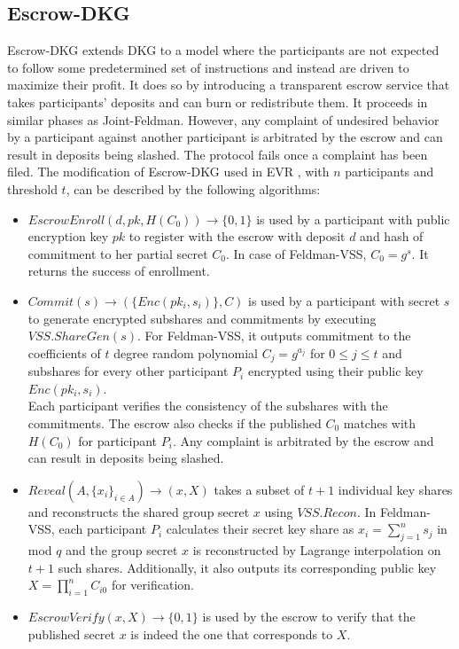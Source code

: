 \documentclass[letterpaper,twocolumn,10pt]{article}
\theoremstyle{definition}
\theoremstyle{remark}
\begin{document}
\subsection{Escrow-DKG}
\label{appendix:edkg}
Escrow-DKG \cite{david2019rational} extends DKG to a model where the participants are not expected to follow some predetermined set of instructions and instead are driven to maximize their profit. It does so by introducing a transparent escrow service that takes participants' deposits and can burn or redistribute them. It proceeds in similar phases as Joint-Feldman. However, any complaint of undesired behavior by a participant against another participant is arbitrated by the escrow and can result in deposits being slashed. The protocol fails once a complaint has been filed. The modification of Escrow-DKG used in EVR , with $n$ participants and threshold $t$, can be described by the following algorithms:
\begin{itemize}
    \item $EscrowEnroll(d, pk, H(C_{0})) \rightarrow \{0,1\}$ is used by a participant with public encryption key $pk$ to register with the escrow with deposit $d$ and hash of commitment to her partial secret $C_{0}$. In case of Feldman-VSS, $C_{0} = g^{s}$. It returns the success of enrollment.
    
    \item $Commit (s) \rightarrow (\{Enc(pk_i, s_{i})\}, C)$ is used by a participant with secret $s$ to generate encrypted subshares and commitments by executing $VSS.ShareGen(s)$. For Feldman-VSS, it outputs commitment to the coefficients of $t$ degree random polynomial $C_j = g^{a_j}$ for $0\le j \le t$ and subshares for every other participant $P_i$ encrypted using their public key $Enc(pk_i, s_{i})$. \\
    Each participant verifies the consistency of the subshares with the commitments. The escrow also checks if the published $C_{0}$ matches with $H(C_{0})$ for participant $P_i$. Any complaint is arbitrated by the escrow and can result in deposits being slashed.
    
    \item $Reveal(A, \{x_i\}_{i \in A}) \rightarrow (x, X)$ takes a subset of $t+1$ individual key shares and reconstructs the shared group secret $x$ using $VSS.Recon$. In Feldman-VSS, each participant $P_i$ calculates their secret key share as $x_i = \sum_{j=1}^{n} s_j$ in mod $q$ and the group secret $x$ is reconstructed by Lagrange interpolation on $t+1$ such shares. Additionally, it also outputs its corresponding public key $X = \prod_{i=1}^{n} C_{i0}$ for verification.
    
    \item $EscrowVerify(x, X)\rightarrow\{0,1\}$ is used by the escrow to verify that the published secret $x$ is indeed the one that corresponds to $X$.
\end{itemize}
\end{document}
